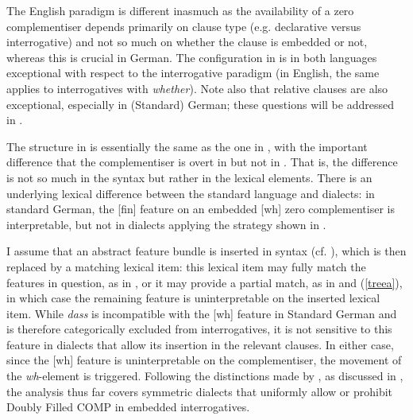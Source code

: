 The English paradigm is different inasmuch as the availability of a zero complementiser depends primarily on clause type (e.g. declarative versus interrogative) and not so much on whether the clause is embedded or not, whereas this is crucial in German. The configuration in  is in both languages exceptional with respect to the interrogative paradigm (in English, the same applies to interrogatives with \textit{whether}). Note also that relative clauses are also exceptional, especially in (Standard) German; these questions will be addressed in .

The structure in  is essentially the same as the one in , with the important difference that the complementiser is overt in  but not in . That is, the difference is not so much in the syntax but rather in the lexical elements. There is an underlying lexical difference between the standard language and dialects: in standard German, the [fin] feature on an embedded [wh] zero complementiser is interpretable, but not in dialects applying the strategy shown in . 

I assume that an abstract feature bundle is inserted in syntax (cf. \citealt{chomskylasnik1977}), which is then replaced by a matching lexical item: this lexical item may fully match the features in question, as in , or it may provide a partial match, as in  and (\ref{treea}), in which case the remaining feature is uninterpretable on the inserted lexical item. While \textit{dass} is incompatible with the [wh] feature in Standard German and is therefore categorically excluded from interrogatives, it is not sensitive to this feature in dialects that allow its insertion in the relevant clauses. In either case, since the [wh] feature is uninterpretable on the complementiser, the movement of the \textit{wh}-element is triggered. Following the distinctions made by \citet{bayerbrandner2008}, as discussed in , the analysis thus far covers symmetric dialects that uniformly allow or prohibit Doubly Filled COMP in embedded interrogatives.

